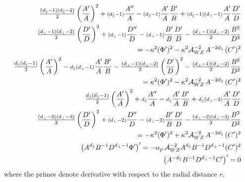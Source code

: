 \documentclass[a4paper,12pt]{article}
\def\dpar{d_{\scriptscriptstyle\parallel}}
\def\dperp{d_{\scriptscriptstyle\perp}}
\def\scpt{\scriptstyle}
\newcommand{\sfrac}[2]{{\textstyle\frac{#1}{#2}}}
\begin{document}
\begin{eqnarray}
\nonumber
&&
\hspace{-.5cm}
\sfrac{(\dpar-1)(\dpar-2)}{2} \left( \frac{A^\prime}{A} \right)^2
+{\scpt (\dpar-1)} \frac{A^{\prime\prime}}{A}
-{\scpt (\dpar-1)} \frac{A^\prime}{A} \frac{B^\prime}{B}
+{\scpt (\dpar-1)(\dperp-1)}  \frac{A^\prime}{A} \frac{D^\prime}{D}
\\
\nonumber
&&
\ \ \
\sfrac{(\dperp-1)(\dperp-2)}{2} \left( \frac{D^\prime}{D} \right)^2
+{\scpt (\dperp-1)} \frac{D^{\prime\prime}}{D}
-{\scpt (\dperp-1)} \frac{B^\prime}{B} \frac{D^\prime}{D}
-\sfrac{(\dperp-1)(\dperp-2)}{2}  \frac{B^2}{D^2}
\\
	\label{eq:Gmunu}
&&
\ \ \  =
-\kappa^2 (\Phi^{\prime})^2
-\kappa^2 {\cal A}_{WZ}^{-2} \, A^{-2 \dpar} \, (C^\prime)^2
\\
\nonumber
&&
\hspace{-.5cm}
\sfrac{\dpar(\dpar-1)}{2} \left( \frac{A^\prime}{A} \right)^2
-{\scpt \dpar(\dperp-1)} \frac{A^\prime}{A} \frac{B^\prime}{B}
-\sfrac{(\dperp-1)(\dperp-2)}{2} \left( \frac{D^\prime}{D} \right)^2
-\sfrac{(\dperp-1)(\dperp-2)}{2}  \frac{B^2}{D^2}
\\
	\label{eq:Grr}
&&
\ \ \ =
\kappa^2 (\Phi^{\prime})^2
-\kappa^2 {\cal A}_{WZ}^{-2} \, A^{-2 \dpar} \, (C^\prime)^2
\\
\nonumber
&&
\hspace{-.5cm}
\sfrac{\dpar(\dpar-1)}{2} \left( \frac{A^\prime}{A} \right)^2
+{\scpt \dpar} \frac{A^{\prime\prime}}{A}
-{\scpt \dpar} \frac{A^\prime}{A} \frac{B^\prime}{B}
+{\scpt \dpar(\dperp-2)}  \frac{A^\prime}{A} \frac{D^\prime}{D}
\\
\nonumber
&&
\ \ \
\sfrac{(\dperp-2)(\dperp-3)}{2} \left( \frac{D^\prime}{D} \right)^2
+{\scpt (\dperp-2)} \frac{D^{\prime\prime}}{D}
-{\scpt (\dperp-2)} \frac{B^\prime}{B} \frac{D^\prime}{D}
-\sfrac{(\dperp-2)(\dperp-3)}{2}  \frac{B^2}{D^2}
\\
	\label{eq:Gab}
&&
\ \ \ =
-\kappa^2 (\Phi^{\prime})^2
+\kappa^2 {\cal A}_{WZ}^{-2} \, A^{-2 \dpar} \, (C^\prime)^2
\\
	 \label{eq:dilaton}
& &
\hspace{-.5cm}
\left( A^{\dpar} B^{-1} D^{\dperp-1} \Phi^\prime \right)^\prime
=
-\alpha_p \, {\cal A}_{WZ}^{-2}  A^{\dpar} B^{-1} D^{\dperp-1} (C^\prime)^2
\\
	\label{eq:tenseur}
& &
\hspace{-.5cm}
\left( A^{-\dpar} B^{-1} D^{\dperp-1} C^\prime \right)^{\prime}
= 0
\end{eqnarray}
%
%
where the primes denote derivative with respect to the radial
distance $r$.
\end{document}
